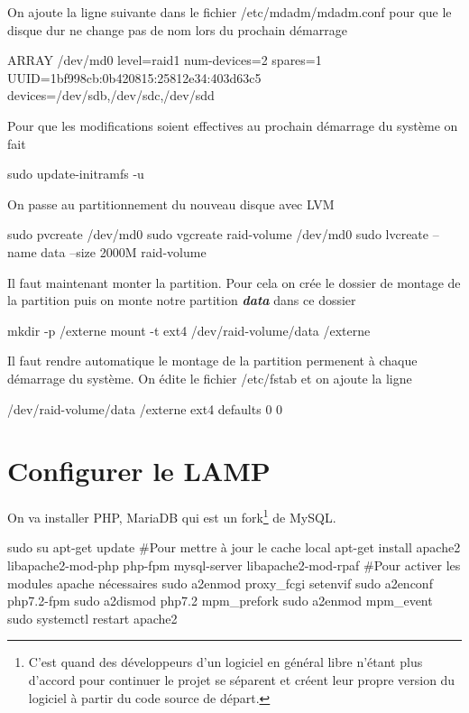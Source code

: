 \documentclass[a4paper,12pt,french]{report} %
\begin{document}
On ajoute la ligne suivante dans le fichier /etc/mdadm/mdadm.conf pour que le disque dur ne change pas de nom lors du prochain démarrage
\begin{exempleConsole}
ARRAY /dev/md0 level=raid1 num-devices=2 spares=1 UUID=1bf998cb:0b420815:25812e34:403d63c5 devices=/dev/sdb,/dev/sdc,/dev/sdd
\end{exempleConsole}

Pour que les modifications soient effectives au prochain démarrage du système on fait 
\begin{exempleConsole}
sudo update-initramfs -u
\end{exempleConsole}

On passe au partitionnement du nouveau disque avec LVM
\begin{exempleConsole}
sudo pvcreate /dev/md0
sudo vgcreate raid-volume /dev/md0 
sudo lvcreate --name data --size 2000M raid-volume
\end{exempleConsole}
Il faut maintenant monter la partition. Pour cela on crée le dossier de montage de la partition puis on monte notre partition \emph{\textbf{data}} dans ce dossier 
\begin{exempleConsole}
mkdir -p /externe
mount -t ext4 /dev/raid-volume/data /externe
\end{exempleConsole}

Il faut rendre automatique le montage de la partition permenent à chaque démarrage du système. On édite le fichier /etc/fstab et on ajoute la ligne
\begin{exempleConsole}
/dev/raid-volume/data /externe ext4 defaults 0 0
\end{exempleConsole}

\section{Configurer le LAMP}
On va installer PHP, MariaDB qui est un fork\footnote{C'est quand des développeurs d'un logiciel en général libre n'étant plus d'accord pour continuer le projet se séparent et créent leur propre version du logiciel à partir du code source de départ.} de MySQL.
\begin{exempleConsole}
sudo su
apt-get update #Pour mettre à jour le cache local
apt-get install apache2 libapache2-mod-php php-fpm mysql-server libapache2-mod-rpaf
#Pour activer les modules apache nécessaires
sudo a2enmod proxy_fcgi setenvif
sudo a2enconf php7.2-fpm
sudo a2dismod php7.2 mpm_prefork
sudo a2enmod mpm_event
sudo systemctl restart apache2
\end{exempleConsole}
\end{document}
